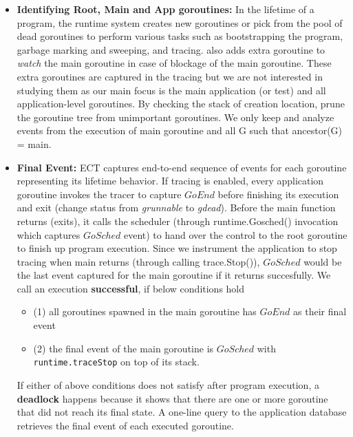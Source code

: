 \begin{itemize}
  \item \textbf{Identifying Root, Main and App goroutines:}
  In the lifetime of a program, the runtime system creates new goroutines or pick from the pool of dead goroutines to perform various tasks such as bootstrapping the program, garbage marking and sweeping, and tracing.
  \goat also adds extra goroutine to \textit{watch} the main goroutine in case of blockage of the main goroutine.
  These extra goroutines are captured in the tracing but we are not interested in studying them as our main focus is the main application (or test) and all application-level goroutines.
  By checking the stack of creation location, \goat prune the goroutine tree from unimportant goroutines.
  We only keep and analyze events from the execution of main goroutine and all G such that ancestor(G) = main.
  \item \textbf{Final Event:}
  ECT captures end-to-end sequence of events for each goroutine representing its lifetime behavior.
  If tracing is enabled, every application goroutine invokes the tracer to capture $GoEnd$ before finishing its execution and exit (change status from \textit{grunnable} to \textit{gdead})\cite{goexit-line-of-code}.
  Before the main function returns (\ie exits), it calls the scheduler (through runtime.Gosched() invocation which captures $GoSched$ event) to hand over the control to the root goroutine to finish up program execution.
  Since we instrument the application to stop tracing when main returns (through calling trace.Stop()), $GoSched$ would be the last event captured for the main goroutine if it returns succesfully.
  We call an execution \textbf{successful}, if below conditions hold
  \begin{itemize}
    \item (1) all goroutines spawned in the main goroutine has $GoEnd$ as their final event
    \item (2) the final event of the main goroutine is $GoSched$ with \texttt{runtime.traceStop} on top of its stack.
  \end{itemize}
  If either of above conditions does not satisfy after program execution, a \textbf{deadlock} happens because it shows that there are one or more goroutine that did not reach its final state.
  A one-line query to the application database retrieves the final event of each executed goroutine.
    
\end{itemize}
